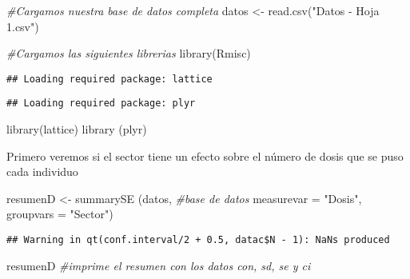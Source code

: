 \documentclass[
]{article}
\newenvironment{Shaded}{\begin{snugshade}}{\end{snugshade}}
\newcommand{\AttributeTok}[1]{\textcolor[rgb]{0.77,0.63,0.00}{#1}}
\newcommand{\CommentTok}[1]{\textcolor[rgb]{0.56,0.35,0.01}{\textit{#1}}}
\newcommand{\FunctionTok}[1]{\textcolor[rgb]{0.00,0.00,0.00}{#1}}
\newcommand{\NormalTok}[1]{#1}
\newcommand{\OtherTok}[1]{\textcolor[rgb]{0.56,0.35,0.01}{#1}}
\newcommand{\StringTok}[1]{\textcolor[rgb]{0.31,0.60,0.02}{#1}}
\begin{document}
\begin{Shaded}
\begin{Highlighting}[]
\CommentTok{\#Cargamos nuestra base de datos completa}
\NormalTok{datos }\OtherTok{\textless{}{-}} \FunctionTok{read.csv}\NormalTok{(}\StringTok{"Datos {-} Hoja 1.csv"}\NormalTok{)}

\CommentTok{\#Cargamos las siguientes librerias}
\FunctionTok{library}\NormalTok{(Rmisc) }
\end{Highlighting}
\end{Shaded}

\begin{verbatim}
## Loading required package: lattice
\end{verbatim}

\begin{verbatim}
## Loading required package: plyr
\end{verbatim}

\begin{Shaded}
\begin{Highlighting}[]
\FunctionTok{library}\NormalTok{(lattice)}
\FunctionTok{library}\NormalTok{ (plyr)}
\end{Highlighting}
\end{Shaded}

Primero veremos si el sector tiene un efecto sobre el número de dosis
que se puso cada individuo

\begin{Shaded}
\begin{Highlighting}[]
\NormalTok{resumenD }\OtherTok{\textless{}{-}} \FunctionTok{summarySE}\NormalTok{ (datos, }\CommentTok{\#base de datos}
                      \AttributeTok{measurevar =} \StringTok{"Dosis"}\NormalTok{, }
                      \AttributeTok{groupvars =} \StringTok{"Sector"}\NormalTok{) }
\end{Highlighting}
\end{Shaded}

\begin{verbatim}
## Warning in qt(conf.interval/2 + 0.5, datac$N - 1): NaNs produced
\end{verbatim}

\begin{Shaded}
\begin{Highlighting}[]
\NormalTok{resumenD }\CommentTok{\#imprime el resumen con los datos con, sd, se y ci}
\end{Highlighting}
\end{Shaded}
\end{document}
